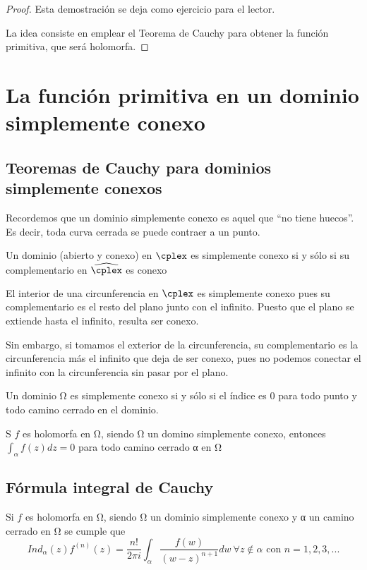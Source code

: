 \documentclass{apuntes}
\begin{document}
\begin{proof}
Esta demostración se deja como ejercicio para el lector.

La idea consiste en emplear el Teorema de Cauchy para obtener la función primitiva, que será holomorfa.
\end{proof}

\section{La función primitiva en un dominio simplemente conexo}
\subsection{Teoremas de Cauchy para dominios simplemente conexos}

Recordemos que un dominio simplemente conexo es aquel que ``no tiene huecos''. Es decir, toda curva cerrada se puede contraer a un punto.

\begin{defn}
Un dominio (abierto y conexo) en $\cplex$ es simplemente conexo si y sólo si su complementario en $\widehat{\cplex}$ es conexo
\end{defn}

\begin{example}
El interior de una circunferencia en $\cplex$ es simplemente conexo pues su complementario es el resto del plano junto con el infinito. Puesto que el plano se extiende hasta el infinito, resulta ser conexo.

Sin embargo, si tomamos el exterior de la circunferencia, su complementario es la circunferencia más el infinito que deja de ser conexo, pues no podemos conectar el infinito con la circunferencia sin pasar por el plano.
\end{example}

\obs Un dominio Ω es simplemente conexo si y sólo si el índice es 0 para todo punto y todo camino cerrado en el dominio.

\begin{theorem}
S $f$ es holomorfa en Ω, siendo Ω un domino simplemente conexo, entonces $\int_α f(z)dz=0$ para todo camino cerrado α en Ω
\end{theorem}

\subsection{Fórmula integral de Cauchy}
Si $f$ es holomorfa en Ω, siendo Ω un dominio simplemente conexo y α un camino cerrado en Ω se cumple que
\[Ind_α(z)f^{(n)}(z) = \frac{n!}{2πi}\int_α \frac{f(w)}{(w-z)^{n+1}}dw \ \forall z \notin α \text{ con } n= 1,2,3,...\]
\end{document}
